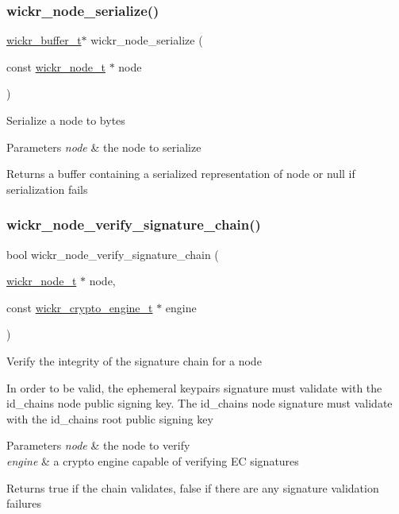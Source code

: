 \subsubsection{\texorpdfstring{wickr\+\_\+node\+\_\+serialize()}{wickr\_node\_serialize()}}
{\footnotesize\ttfamily \mbox{\hyperlink{structwickr__buffer}{wickr\+\_\+buffer\+\_\+t}}$\ast$ wickr\+\_\+node\+\_\+serialize (\begin{DoxyParamCaption}\item[{const \mbox{\hyperlink{structwickr__node}{wickr\+\_\+node\+\_\+t}} $\ast$}]{node }\end{DoxyParamCaption})}

Serialize a node to bytes


\begin{DoxyParams}{Parameters}
{\em node} & the node to serialize \\
\hline
\end{DoxyParams}
\begin{DoxyReturn}{Returns}
a buffer containing a serialized representation of \textquotesingle{}node\textquotesingle{} or null if serialization fails 
\end{DoxyReturn}
\mbox{\label{group__wickr__node_gac9e2d96e9109590124b2fd05a8826c1d}} 
\subsubsection{\texorpdfstring{wickr\+\_\+node\+\_\+verify\+\_\+signature\+\_\+chain()}{wickr\_node\_verify\_signature\_chain()}}
{\footnotesize\ttfamily bool wickr\+\_\+node\+\_\+verify\+\_\+signature\+\_\+chain (\begin{DoxyParamCaption}\item[{\mbox{\hyperlink{structwickr__node}{wickr\+\_\+node\+\_\+t}} $\ast$}]{node,  }\item[{const \mbox{\hyperlink{structwickr__crypto__engine}{wickr\+\_\+crypto\+\_\+engine\+\_\+t}} $\ast$}]{engine }\end{DoxyParamCaption})}

Verify the integrity of the signature chain for a node

In order to be valid, the ephemeral keypair\textquotesingle{}s signature must validate with the id\+\_\+chain\textquotesingle{}s \textquotesingle{}node\textquotesingle{} public signing key. The id\+\_\+chain\textquotesingle{}s \textquotesingle{}node\textquotesingle{} signature must validate with the id\+\_\+chain\textquotesingle{}s \textquotesingle{}root\textquotesingle{} public signing key


\begin{DoxyParams}{Parameters}
{\em node} & the node to verify \\
\hline
{\em engine} & a crypto engine capable of verifying EC signatures \\
\hline
\end{DoxyParams}
\begin{DoxyReturn}{Returns}
true if the chain validates, false if there are any signature validation failures 
\end{DoxyReturn}
